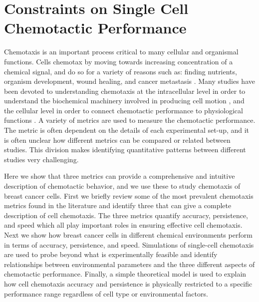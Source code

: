 
\chapter{Constraints on Single Cell Chemotactic Performance}

Chemotaxis is an important process critical to many cellular and organismal functions. Cells chemotax by moving towards increasing concentration of a chemical signal, and do so for a variety of reasons such as: finding nutrients, organism development, wound healing, and cancer metastasis \red{[CITE]}. Many studies have been devoted to understanding chemotaxis at the intracellular level in order to understand the biochemical machinery involved in producing cell motion \cite{petrie2009random}, and the cellular level in order to connect chemotactic performance to physiological functions \red{[CITE]}. A variety of metrics are used to measure the chemotactic performance. The metric is often dependent on the details of each experimental set-up, and it is often unclear how different metrics can be compared or related between studies. This division makes identifying quantitative patterns between different studies very challenging.


Here we show that three metrics can provide a comprehensive and intuitive description of chemotactic behavior, and we use these to study chemotaxis of breast cancer cells. First we briefly review some of the most prevalent chemotaxis metrics found in the literature and identify three that can give a complete description of cell chemotaxis. The three metrics quantify accuracy, persistence, and speed which all play important roles in ensuring effective cell chemotaxis. Next we show how breast cancer cells in different chemical environments perform in terms of accuracy, persistence, and speed. Simulations of single-cell chemotaxis are used to probe beyond what is experimentally feasible and identify relationships between environmental parameters and the three different aspects of chemotactic performance. Finally, a simple theoretical model is used to explain how cell chemotaxis accuracy and persistence is physically restricted to a specific performance range regardless of cell type or environmental factors.

